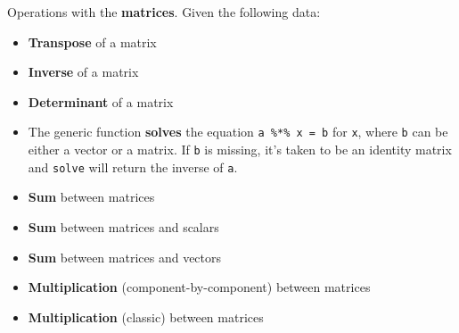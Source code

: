 \documentclass[a4paper]{article}
\begin{document}
    \noindent
    Operations with the \textbf{matrices}. Given the following data:
    
    \begin{itemize}
        \item \textbf{Transpose} of a matrix
        

        \item \textbf{Inverse} of a matrix
        

        \item \textbf{Determinant} of a matrix
        

        \item The generic function \textbf{solves} the equation \texttt{a \%*\% x = b} for \texttt{x}, where \texttt{b} can be either a vector or a matrix. If \texttt{b} is missing, it's taken to be an identity matrix and \texttt{solve} will return the inverse of \texttt{a}.
        

        \item \textbf{Sum} between matrices
        

        \item \textbf{Sum} between matrices and scalars
        

        \item \textbf{Sum} between matrices and vectors
        

        \item \textbf{Multiplication} (component-by-component) between matrices
        

        \item \textbf{Multiplication} (classic) between matrices
        
    \end{itemize}

    \newpage
\end{document}
